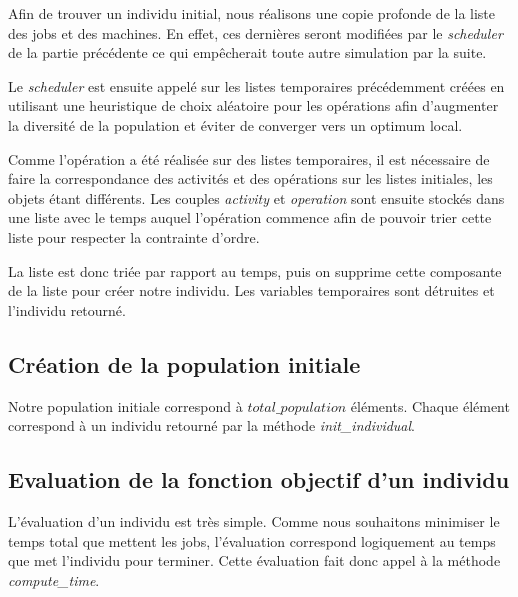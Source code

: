 Afin de trouver un individu initial, nous réalisons une copie profonde de la liste des jobs et des machines. En effet, ces dernières seront modifiées par le \textit{scheduler} de la partie précédente ce qui empêcherait toute autre simulation par la suite. 



Le \textit{scheduler} est ensuite appelé sur les listes temporaires précédemment créées en utilisant une heuristique de choix aléatoire pour les opérations afin d'augmenter la diversité de la population et éviter de converger vers un optimum local.



Comme l'opération a été réalisée sur des listes temporaires, il est nécessaire de faire la correspondance des activités et des opérations sur les listes initiales, les objets étant différents. Les couples \textit{activity} et \textit{operation} sont ensuite stockés dans une liste avec le temps auquel l'opération commence afin de pouvoir trier cette liste pour respecter la contrainte d'ordre.



La liste est donc triée par rapport au temps, puis on supprime cette composante de la liste pour créer notre individu. Les variables temporaires sont détruites et l'individu retourné.

\subsection{Création de la population initiale}



Notre population initiale correspond à $total\_population$ éléments. Chaque élément correspond à un individu retourné par la méthode \textit{init\_individual}.

\subsection{Evaluation de la fonction objectif d'un individu}



L'évaluation d'un individu est très simple. Comme nous souhaitons minimiser le temps total que mettent les jobs, l'évaluation correspond logiquement au temps que met l'individu pour terminer. Cette évaluation fait donc appel à la méthode \textit{compute\_time}. 

